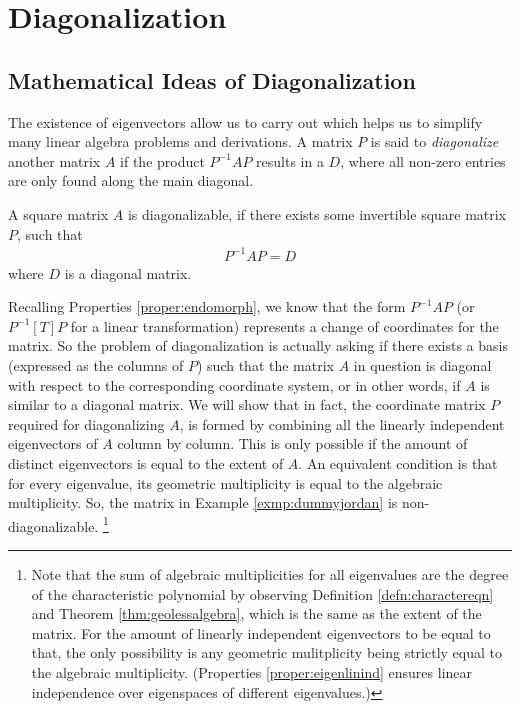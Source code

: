 \section{Diagonalization}

\subsection{Mathematical Ideas of Diagonalization}
The existence of eigenvectors allow us to carry out  which helps us to simplify many linear algebra problems and derivations. A matrix $P$ is said to \textit{diagonalize} another matrix $A$ if the product $P^{-1}AP$ results in a  $D$, where all non-zero entries are only found along the main diagonal.
\begin{defn}[Diagonalization]
A square matrix $A$ is diagonalizable, if there exists some invertible square matrix $P$, such that
\begin{align*}
P^{-1}AP = D
\end{align*}
where $D$ is a diagonal matrix.
\end{defn}
Recalling Properties \ref{proper:endomorph}, we know that the form $P^{-1}AP$ (or $P^{-1}[T]P$ for a linear transformation) represents a change of coordinates for the matrix. So the problem of diagonalization is actually asking if there exists a basis (expressed as the columns of $P$) such that the matrix $A$ in question is diagonal with respect to the corresponding coordinate system, or in other words, if $A$ is similar to a diagonal matrix. We will show that in fact, the coordinate matrix $P$ required for diagonalizing $A$, is formed by combining all the linearly independent eigenvectors of $A$ column by column. This is only possible if the amount of distinct eigenvectors is equal to the extent of $A$. An equivalent condition is that for every eigenvalue, its geometric multiplicity is equal to the algebraic multiplicity. So, the matrix in Example \ref{exmp:dummyjordan} is non-diagonalizable. \footnote{Note that the sum of algebraic multiplicities for all eigenvalues are the degree of the characteristic polynomial by observing Definition \ref{defn:charactereqn} and Theorem \ref{thm:geolessalgebra}, which is the same as the extent of the matrix. For the amount of linearly independent eigenvectors to be equal to that, the only possibility is any geometric mulitplicity being strictly equal to the algebraic multiplicity. (Properties \ref{proper:eigenlinind} ensures linear independence over eigenspaces of different eigenvalues.)}
